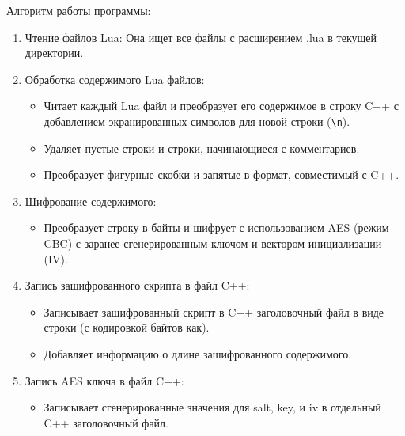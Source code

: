 Алгоритм работы программы:
\begin{enumerate}
	\item Чтение файлов Lua: Она ищет все файлы с расширением .lua в текущей директории.
	
	\item Обработка содержимого Lua файлов:
	
	\begin{itemize}
		\item Читает каждый Lua файл и преобразует его содержимое в строку C++ с добавлением экранированных символов для новой строки (\texttt{\textbackslash n}).
		\item Удаляет пустые строки и строки, начинающиеся с комментариев.
		\item Преобразует фигурные скобки и запятые в формат, совместимый с C++.
	\end{itemize}
	
	\item Шифрование содержимого:
	
	\begin{itemize}
		\item Преобразует строку в байты и шифрует с использованием AES (режим CBC) с заранее сгенерированным ключом и вектором инициализации (IV).
	\end{itemize}
	
	\item Запись зашифрованного скрипта в файл C++:
	
	\begin{itemize}
		\item Записывает зашифрованный скрипт в C++ заголовочный файл в виде строки (с кодировкой байтов как).
		\item Добавляет информацию о длине зашифрованного содержимого.
	\end{itemize}
	
	\item Запись AES ключа в файл C++:
	
	\begin{itemize}
		\item Записывает сгенерированные значения для salt, key, и iv в отдельный C++ заголовочный файл.
	\end{itemize}
\end{enumerate}
\clearpage